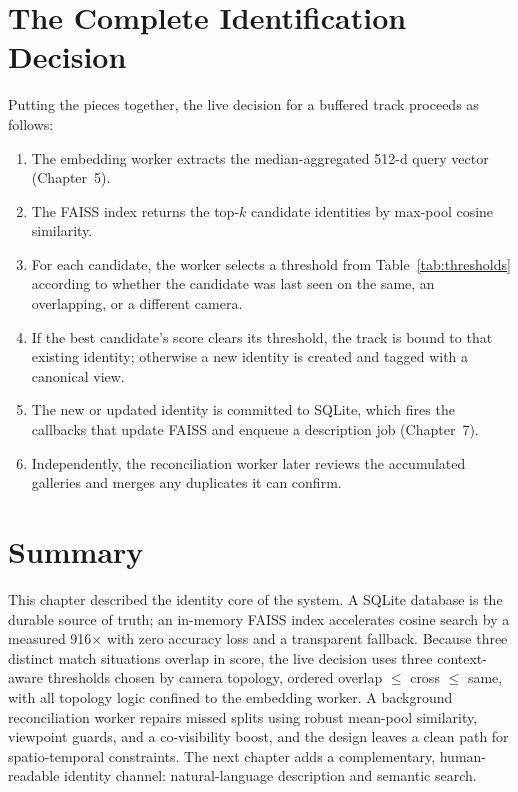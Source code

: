 \documentclass[12pt]{report}
\begin{document}
\section{The Complete Identification Decision}
Putting the pieces together, the live decision for a buffered track proceeds as follows:
\begin{enumerate}
    \item The embedding worker extracts the median-aggregated 512-d query vector (Chapter~5).
    \item The FAISS index returns the top-$k$ candidate identities by max-pool cosine similarity.
    \item For each candidate, the worker selects a threshold from Table~\ref{tab:thresholds} according to whether the candidate was last seen on the same, an overlapping, or a different camera.
    \item If the best candidate's score clears its threshold, the track is bound to that existing identity; otherwise a new identity is created and tagged with a canonical view.
    \item The new or updated identity is committed to SQLite, which fires the callbacks that update FAISS and enqueue a description job (Chapter~7).
    \item Independently, the reconciliation worker later reviews the accumulated galleries and merges any duplicates it can confirm.
\end{enumerate}

\section{Summary}
This chapter described the identity core of the system. A SQLite database is the durable source of truth; an in-memory FAISS index accelerates cosine search by a measured 916$\times$ with zero accuracy loss and a transparent fallback. Because three distinct match situations overlap in score, the live decision uses three context-aware thresholds chosen by camera topology, ordered overlap $\leq$ cross $\leq$ same, with all topology logic confined to the embedding worker. A background reconciliation worker repairs missed splits using robust mean-pool similarity, viewpoint guards, and a co-visibility boost, and the design leaves a clean path for spatio-temporal constraints. The next chapter adds a complementary, human-readable identity channel: natural-language description and semantic search.

\newpage
\end{document}
